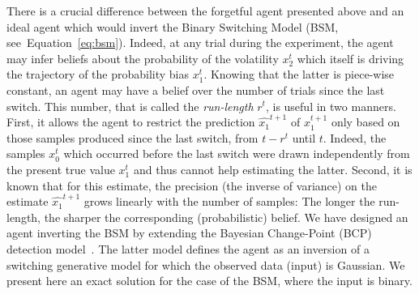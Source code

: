 \documentclass[12pt,english]{article}%
\newcommand{\citep}[1]{\parencite{#1}}
\newcommand{\seeEq}[1]{Equation~\ref{eq:#1}}
\newcommand{\AM}[1]{\textbf{\textcolor{blue}{[AM: #1]}}}
\begin{document}
There is a crucial difference between the forgetful agent presented above
and an ideal agent which would invert the Binary Switching Model (BSM, see~\seeEq{bsm}).
Indeed, at any trial during the experiment,
the agent may infer beliefs about the probability of the volatility $x_2^t$
which itself is driving the trajectory of the probability bias $x_1^t$.
Knowing that the latter is piece-wise constant,
an agent may have a belief over the number of trials since the last switch.
This number, that is called the \emph{run-length} $r^t$, is useful in two manners.
First, it allows the agent to restrict the prediction $\hat{x_1}^{t+1}$ of $x_1^{t+1}$
only based on those samples produced since the last switch, from $t-r^t$ until $t$.
Indeed, the samples $x_0^t$ which occurred before the last switch
were drawn independently from the present true value $x_1^t$
and thus cannot help estimating the latter.
Second, it is known that for this estimate, the precision
(the inverse of variance) on the estimate $\hat{x_1}^{t+1}$
grows linearly with the number of samples:
The longer the run-length, the sharper the corresponding (probabilistic) belief.
We have designed an agent inverting the BSM by extending
the Bayesian Change-Point (BCP) detection model~\citep{AdamsMackay2007}.
The latter model defines the agent as an inversion of a switching generative model
for which the observed data (input) is Gaussian.
We present here an exact solution for the case of the BSM, where the input is binary. %
\end{document}
